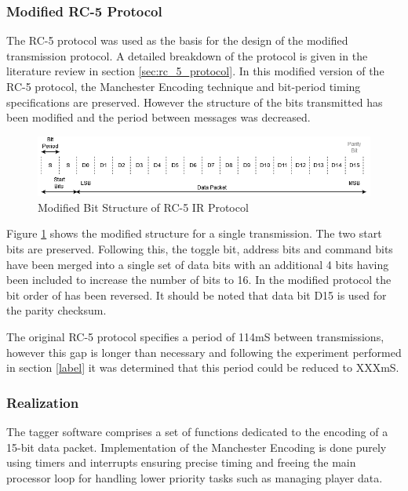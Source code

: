 \subsubsection{Modified RC-5 Protocol}
\label{sec:modified_rc5_protocol}
The RC-5 protocol was used as the basis for the design of the modified transmission protocol. A detailed breakdown of the protocol is given in the literature review in section \ref{sec:rc_5_protocol}. In this modified version of the RC-5 protocol, the Manchester Encoding technique and bit-period timing specifications are preserved. However the structure of the bits transmitted has been modified and the period between messages was decreased.

\begin{figure}[H]
	\centering
	\includegraphics[width=0.8\linewidth]{figures/design/modified_rc5_protocol.png}
	\caption{Modified Bit Structure of RC-5 IR Protocol}
	\label{fig:modified_rc_5_protocol}
\end{figure}

Figure \ref{fig:modified_rc_5_protocol} shows the modified structure for a single transmission. The two start bits are preserved. Following this, the toggle bit, address bits and command bits have been merged into a single set of data bits with an additional 4 bits having been included to increase the number of bits to 16. In the modified protocol the bit order of has been reversed. It should be noted that data bit D15 is used for the parity checksum.

The original RC-5 protocol specifies a period of 114mS between transmissions, however this gap is longer than necessary and following the experiment performed in section \ref{label} it was determined that this period could be reduced to XXXmS.

\subsubsection{Realization}

The tagger software comprises a set of functions dedicated to the encoding of a 15-bit data packet. Implementation of the Manchester Encoding is done purely using timers and interrupts ensuring precise timing and freeing the main processor loop for handling lower priority tasks such as managing player data.

